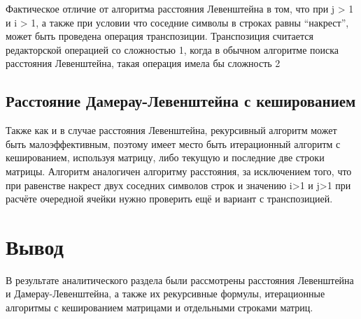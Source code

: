 Фактическое отличие от алгоритма расстояния Левенштейна в том, что при j > 1 и i > 1, а также при условии что соседние символы в строках равны ``накрест'', может быть проведена операция транспозиции. Транспозиция считается редакторской операцией со сложностью 1, когда в обычном алгоритме поиска расстояния Левенштейна, такая операция имела бы сложность 2

\subsection{Расстояние Дамерау-Левенштейна с кешированием}
Также как и в случае расстояния Левенштейна, рекурсивный алгоритм может быть малоэффективным, поэтому имеет место быть итерационный алгоритм с кешированием, используя матрицу, либо текущую и последние две строки матрицы. Алгоритм аналогичен алгоритму расстояния, за исключением того, что при равенстве накрест двух соседних символов строк и значению i>1 и j>1 при расчёте очередной ячейки нужно проверить ещё и вариант с транспозицией.

\section*{Вывод}
В результате аналитического раздела были рассмотрены расстояния Левенштейна и Дамерау-Левенштейна, а также их рекурсивные формулы, итерационные алгоритмы с кешированием матрицами и отдельными строками матриц.

\clearpage